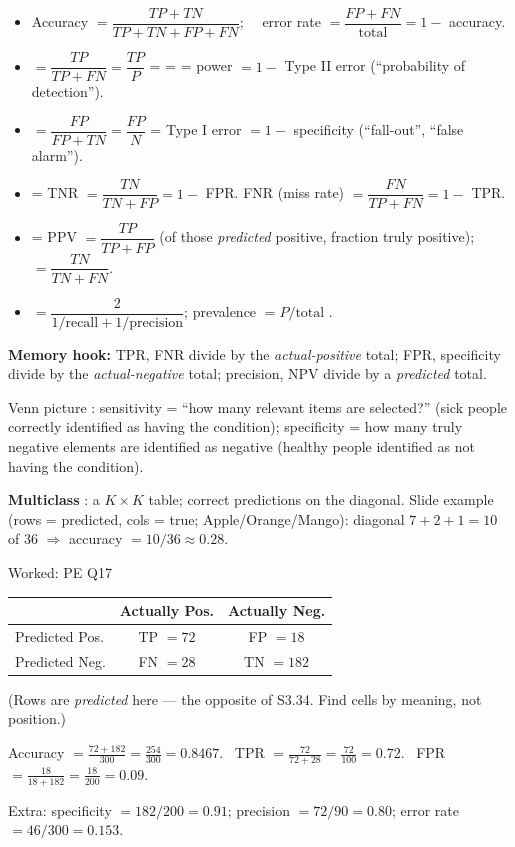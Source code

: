 \begin{keybox}
\begin{itemize}
\item {}Accuracy $=\dfrac{TP+TN}{TP+TN+FP+FN}$; \ \ error rate $=\dfrac{FP+FN}{\text{total}}=1-$ accuracy.
\item {} $=\dfrac{TP}{TP+FN}=\dfrac{TP}{P}$ =  =  = power $=1-$ Type II error
  (``probability of detection'').
\item {} $=\dfrac{FP}{FP+TN}=\dfrac{FP}{N}$ = Type I error $=1-$ specificity (``fall-out'', ``false alarm'').
\item {} = TNR $=\dfrac{TN}{TN+FP}=1-$ FPR. \quad FNR (miss rate) $=\dfrac{FN}{TP+FN}=1-$ TPR.
\item {} = PPV $=\dfrac{TP}{TP+FP}$ (of those \emph{predicted} positive, fraction truly positive);
   $=\dfrac{TN}{TN+FN}$.
\item {} $=\dfrac{2}{1/\text{recall}+1/\text{precision}}$; prevalence $=P/\text{total}$ .
\end{itemize}
\textbf{Memory hook:} TPR, FNR divide by the \emph{actual-positive} total; FPR, specificity divide by the
\emph{actual-negative} total; precision, NPV divide by a \emph{predicted} total.
\end{keybox}
Venn picture : sensitivity = ``how many relevant items are selected?'' (sick people correctly
identified as having the condition); specificity = how many truly negative elements are identified as negative
(healthy people identified as not having the condition).

\textbf{Multiclass} : a $K\times K$ table; correct predictions on the
diagonal. Slide example (rows = predicted, cols = true; Apple/Orange/Mango): diagonal $7+2+1=10$ of $36$
$\Rightarrow$ accuracy $=10/36\approx0.28$.

\begin{qbox}{Worked: PE Q17}
\begin{tabular}{@{}lcc@{}}
\toprule
 & Actually Pos. & Actually Neg.\\
\midrule
Predicted Pos. & TP $=72$ & FP $=18$\\
Predicted Neg. & FN $=28$ & TN $=182$\\
\bottomrule
\end{tabular}
\par (Rows are \emph{predicted} here --- the opposite of S3.34. Find cells by meaning, not position.)
\par Accuracy $=\frac{72+182}{300}=\frac{254}{300}=0.8467$. \ TPR $=\frac{72}{72+28}=\frac{72}{100}=0.72$.
\ FPR $=\frac{18}{18+182}=\frac{18}{200}=0.09$.
\par Extra: specificity $=182/200=0.91$; precision $=72/90=0.80$; error rate $=46/300=0.153$. 
\end{qbox}


